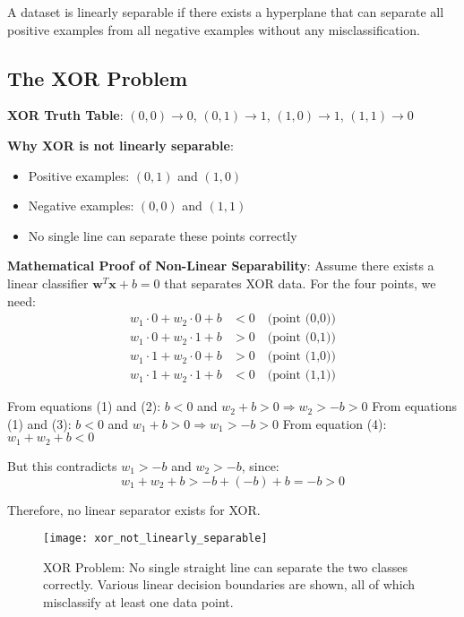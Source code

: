 \begin{definition}
A dataset is linearly separable if there exists a hyperplane that can separate all positive examples from all negative examples without any misclassification.
\end{definition}

\subsection{The XOR Problem}
\textbf{XOR Truth Table}: $(0,0) \rightarrow 0$, $(0,1) \rightarrow 1$, $(1,0) \rightarrow 1$, $(1,1) \rightarrow 0$

\textbf{Why XOR is not linearly separable}:
\begin{itemize}
    \item Positive examples: $(0,1)$ and $(1,0)$
    \item Negative examples: $(0,0)$ and $(1,1)$
    \item No single line can separate these points correctly
\end{itemize}

\textbf{Mathematical Proof of Non-Linear Separability}:
Assume there exists a linear classifier \(\mathbf{w}^T \mathbf{x} + b = 0\) that separates XOR data.
For the four points, we need:
\begin{align}
w_1 \cdot 0 + w_2 \cdot 0 + b &< 0 \quad \text{(point (0,0))} \\
w_1 \cdot 0 + w_2 \cdot 1 + b &> 0 \quad \text{(point (0,1))} \\
w_1 \cdot 1 + w_2 \cdot 0 + b &> 0 \quad \text{(point (1,0))} \\
w_1 \cdot 1 + w_2 \cdot 1 + b &< 0 \quad \text{(point (1,1))}
\end{align}

From equations (1) and (2): \(b < 0\) and \(w_2 + b > 0 \Rightarrow w_2 > -b > 0\)
From equations (1) and (3): \(b < 0\) and \(w_1 + b > 0 \Rightarrow w_1 > -b > 0\)
From equation (4): \(w_1 + w_2 + b < 0\)

But this contradicts \(w_1 > -b\) and \(w_2 > -b\), since:
\[w_1 + w_2 + b > -b + (-b) + b = -b > 0\]

Therefore, no linear separator exists for XOR.

\begin{figure}[h]
    \centering
    \texttt{[image: xor\_not\_linearly\_separable]}
    \caption{XOR Problem: No single straight line can separate the two classes correctly. Various linear decision boundaries are shown, all of which misclassify at least one data point.}
    \label{fig:xor_not_linearly_separable}
\end{figure}

